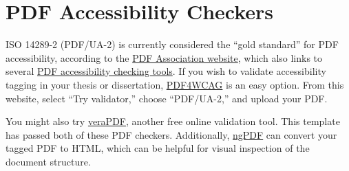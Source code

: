 \section{PDF Accessibility Checkers}\label{sec:checkers}
ISO 14289-2 (PDF/UA-2) is currently considered the ``gold standard'' for PDF accessibility, according to the \href{https://pdfa.org/iso-14289-2-pdf-ua-2-the-gold-standard-for-accessibility-in-pdf-2-0-has-arrived/}{PDF Association website}, which also links to several \href{https://pdfa.org/accessible-math-in-pdf-finally} {PDF accessibility checking tools}. If you wish to validate accessibility tagging in your thesis or dissertation, \href{https://pdf4wcag.com/}{PDF4WCAG} is an easy option. From this website, select ``Try validator,'' choose ``PDF/UA-2,'' and upload your PDF.

You might also try \href{https://demo.verapdf.org}{veraPDF}, another free online validation tool.
This template has passed both of these PDF checkers. Additionally, \href{https://ngpdf.com/}{ngPDF} can convert your tagged PDF to HTML, which can be helpful for visual inspection of the document structure.


